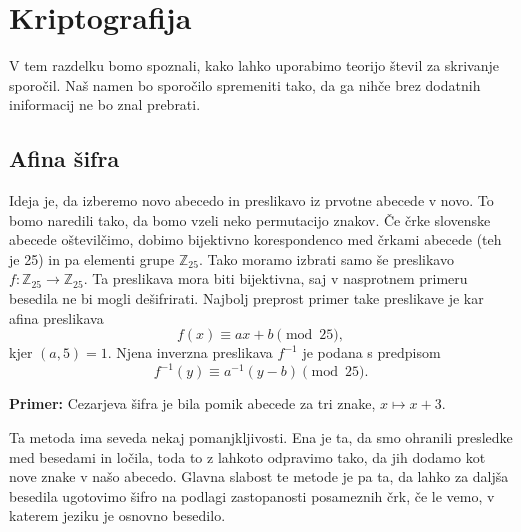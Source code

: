 \documentclass[12pt, a4paper]{article}
\newenvironment{prim}[1][]{\par\medskip\noindent \textbf{Primer: }}{\medskip}
\begin{document}
\section{Kriptografija}
V tem razdelku bomo spoznali, kako lahko uporabimo teorijo števil za skrivanje sporočil. Naš namen bo sporočilo spremeniti tako, da ga nihče brez dodatnih iniformacij ne bo znal prebrati.

\subsection{Afina šifra}
Ideja je, da izberemo novo abecedo in preslikavo iz prvotne abecede v novo. To bomo naredili tako, da bomo vzeli neko permutacijo znakov. Če črke slovenske abecede oštevilčimo, dobimo bijektivno korespondenco med črkami abecede (teh je 25) in pa elementi grupe $\mathbb{Z}_{25}$. Tako moramo izbrati samo še preslikavo $f:\mathbb{Z}_{25} \to \mathbb{Z}_{25}$. Ta preslikava mora biti bijektivna, saj v nasprotnem primeru besedila ne bi mogli dešifrirati. Najbolj preprost primer take preslikave je kar afina preslikava 
$$
f(x)\equiv ax+b\pmod{25},
$$
kjer $(a,5)=1$. Njena inverzna preslikava $f^{-1}$ je podana s predpisom
$$
f^{-1}(y)\equiv a^{-1}(y-b) \pmod{25}.
$$

\begin{prim}
Cezarjeva šifra je bila pomik abecede za tri znake, $x\mapsto x+3$.
\end{prim}

Ta metoda ima seveda nekaj pomanjkljivosti. Ena je ta, da smo ohranili presledke med besedami in ločila, toda to z lahkoto odpravimo tako, da jih dodamo kot nove znake v našo abecedo. Glavna slabost te metode je pa ta, da lahko za daljša besedila ugotovimo šifro na podlagi zastopanosti posameznih črk, če le vemo, v katerem jeziku je osnovno besedilo.
\end{document}
